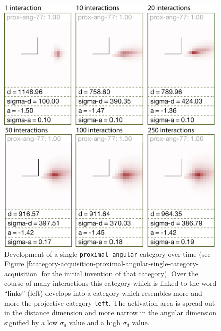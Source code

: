 \begin{figure}
\begin{center}
\includegraphics[width=0.9\columnwidth]{figs/category-acquisition-proximal-angular-category-development-over-time.png}
\end{center}
\caption[Development of a single {\footnotesize\tt proximal-angular} category over time]{%
Development of a single {\footnotesize\tt proximal-angular} category over time (see Figure \ref{f:category-acquisition-proximal-angular-single-category-acquisition} for the initial invention of that category). 
Over the course of many interactions this category which is linked to the word ``links'' (left) develops
into a category which resembles more and more the projective category {\footnotesize\tt left}. 
The activation area is spread out in the distance dimension and more narrow in the angular 
dimension signified by a low $\sigma_a$ value and a high $\sigma_d$ value.}
\label{f:category-acquisition-proximal-angular-category-development-over-time}
\end{figure}

